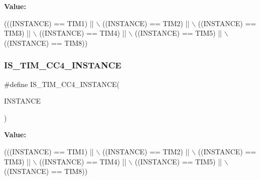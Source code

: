 {\bfseries Value\+:}
\begin{DoxyCode}
(((INSTANCE) == TIM1) || \(\backslash\)
                                         ((INSTANCE) == TIM2) || \(\backslash\)
                                         ((INSTANCE) == TIM3) || \(\backslash\)
                                         ((INSTANCE) == TIM4) || \(\backslash\)
                                         ((INSTANCE) == TIM5) || \(\backslash\)
                                         ((INSTANCE) == TIM8))
\end{DoxyCode}
\mbox{\label{group___exported__macros_gae72b7182a73d81c33196265b31091c07}} 
\subsubsection{\texorpdfstring{I\+S\+\_\+\+T\+I\+M\+\_\+\+C\+C4\+\_\+\+I\+N\+S\+T\+A\+N\+CE}{IS\_TIM\_CC4\_INSTANCE}}
{\footnotesize\ttfamily \#define I\+S\+\_\+\+T\+I\+M\+\_\+\+C\+C4\+\_\+\+I\+N\+S\+T\+A\+N\+CE(\begin{DoxyParamCaption}\item[{}]{I\+N\+S\+T\+A\+N\+CE }\end{DoxyParamCaption})}

{\bfseries Value\+:}
\begin{DoxyCode}
(((INSTANCE) == TIM1) || \(\backslash\)
                                       ((INSTANCE) == TIM2) || \(\backslash\)
                                       ((INSTANCE) == TIM3) || \(\backslash\)
                                       ((INSTANCE) == TIM4) || \(\backslash\)
                                       ((INSTANCE) == TIM5) || \(\backslash\)
                                       ((INSTANCE) == TIM8))
\end{DoxyCode}
\mbox{\label{group___exported__macros_ga8111ef18a809cd882ef327399fdbfc8f}} 
